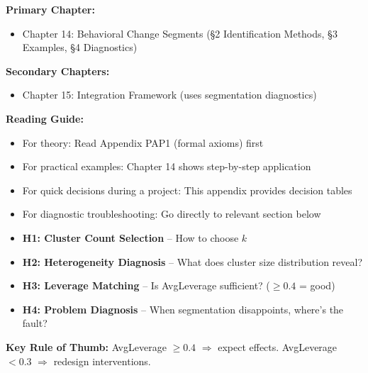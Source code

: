 
\begin{tcolorbox}[colback=purple!5!white, colframe=purple!75!black,
    title=Chapter Linkage]

\textbf{Primary Chapter:}
\begin{itemize}[nosep]
\item Chapter 14: Behavioral Change Segments (§2 Identification Methods, §3 Examples, §4 Diagnostics)
\end{itemize}

\textbf{Secondary Chapters:}
\begin{itemize}[nosep]
\item Chapter 15: Integration Framework (uses segmentation diagnostics)
\end{itemize}

\textbf{Reading Guide:}
\begin{itemize}[nosep]
\item For theory: Read Appendix PAP1 (formal axioms) first
\item For practical examples: Chapter 14 shows step-by-step application
\item For quick decisions during a project: This appendix provides decision tables
\item For diagnostic troubleshooting: Go directly to relevant section below
\end{itemize}

\end{tcolorbox}


\begin{tcolorbox}[colback=yellow!10!white, colframe=yellow!75!black,
    title=Quick Reference: The 4 Heuristics]

\begin{itemize}[nosep]
\item \textbf{H1: Cluster Count Selection} -- How to choose $k$
\item \textbf{H2: Heterogeneity Diagnosis} -- What does cluster size distribution reveal?
\item \textbf{H3: Leverage Matching} -- Is AvgLeverage sufficient? ($\geq 0.4$ = good)
\item \textbf{H4: Problem Diagnosis} -- When segmentation disappoints, where's the fault?
\end{itemize}

\textbf{Key Rule of Thumb:} AvgLeverage $\geq 0.4$ $\Rightarrow$ expect effects. AvgLeverage $< 0.3$ $\Rightarrow$ redesign interventions.

\end{tcolorbox}

